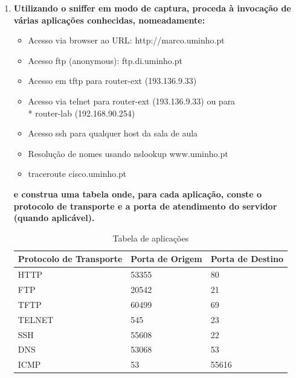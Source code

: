 \documentclass{llncs}
\begin{document}
  \begin{enumerate}[\textbf{b)}]
    \item \textbf{Utilizando o sniffer em modo de captura, proceda à invocação de várias aplicações conhecidas, nomeadamente:}
    \vspace{5mm}
    \begin{itemize}
        \item Acesso via browser ao URL: http://marco.uminho.pt
        \item Acesso ftp (anonymous): ftp.di.uminho.pt
        \item Acesso em tftp para router-ext (193.136.9.33)
        \item Acesso via telnet para router-ext (193.136.9.33) ou para\\*
        router-lab (192.168.90.254)
        \item Acesso ssh para qualquer host da sala de aula
        \item Resolução de nomes usando nslookup www.uminho.pt
        \item traceroute cisco.uminho.pt
    \end{itemize}
    \par \textbf{e construa uma tabela onde, para cada aplicação, conste o protocolo de transporte e a porta de atendimento do
    servidor (quando aplicável).}
    
    \vspace{5mm}
    
    \begin{table}[h!]
      \centering
      \begin{tabular}{p{4.4cm}  p{3cm}  p{3cm}} 
      \hline
      \textbf{Protocolo de Transporte} & \textbf{Porta de Origem} & \textbf{Porta de Destino}\\ [1ex] 
      \hline\hline
      HTTP & 53355 & 80 \\ [1ex]
      FTP & 20542 & 21 \\ [1ex]
      TFTP & 60499 & 69 \\ [1ex]
      TELNET & 545 & 23 \\ [1ex]
      SSH & 55608 & 22 \\ [1ex]
      DNS & 53068 & 53 \\ [1ex]
      ICMP & 53 & 55616 \\ [1ex] 
      \hline
      \end{tabular}
      \caption{Tabela de aplicações}
      \label{table:1}
      \end{table}


  \end{enumerate}
\end{document}
